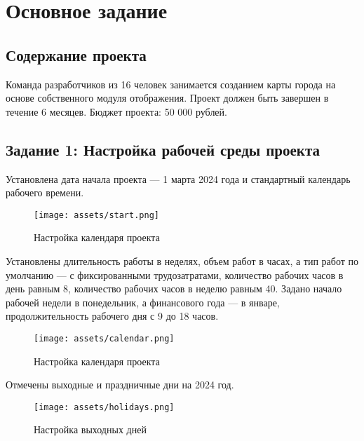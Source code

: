 \chapter{Основное задание}

\section{Содержание проекта}

Команда разработчиков из 16 человек занимается созданием карты города на основе собственного модуля отображения. Проект должен быть завершен в течение 6 месяцев. Бюджет проекта: 50 000 рублей.

\section{Задание 1: Настройка рабочей среды проекта}

Установлена дата начала проекта --- 1 марта 2024 года и стандартный календарь рабочего времени. 

\begin{figure}[H]
    \begin{center}
    \texttt{[image: assets/start.png]}
    \caption{Настройка календаря проекта}
    \label{fig:2}
    \end{center}
\end{figure}

Установлены длительность работы в неделях, объем работ в часах, а тип работ по умолчанию --- с фиксированными трудозатратами, количество рабочих часов в день равным 8, количество рабочих часов в неделю равным 40. Задано начало рабочей недели в понедельник, а финансового года --- в январе, продолжительность рабочего дня с 9 до 18 часов. 

\begin{figure}[H]
    \begin{center}
    \texttt{[image: assets/calendar.png]}
    \caption{Настройка календаря проекта}
    \label{fig:2}
    \end{center}
\end{figure}

Отмечены выходные и праздничные дни на 2024 год. 

\begin{figure}[H]
    \begin{center}
    \texttt{[image: assets/holidays.png]}
    \caption{Настройка выходных дней}
    \label{fig:2}
    \end{center}
\end{figure}

